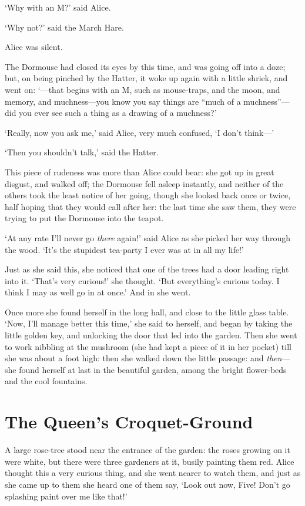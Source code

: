 \documentclass[12pt,openany]{memoir}
\begin{document}
`Why with an M?' said Alice.

`Why not?' said the March Hare.

Alice was silent.

The Dormouse had closed its eyes by this time, and was going off into a doze; but, on being pinched by the Hatter, it woke up again with a little shriek, and went on: `---that begins with an M, such as mouse-traps, and the moon, and memory, and muchness---you know you say things are ``much of a muchness''---did you ever see such a thing as a drawing of a muchness?'

`Really, now you ask me,' said Alice, very much confused, `I don't think---'

`Then you shouldn't talk,' said the Hatter.

This piece of rudeness was more than Alice could bear: she got up in great disgust, and walked off; the Dormouse fell asleep instantly, and neither of the others took the least notice of her going, though she looked back once or twice, half hoping that they would call after her: the last time she saw them, they were trying to put the Dormouse into the teapot.

`At any rate I'll never go \textit{there} again!' said Alice as she picked her way through the wood. `It's the stupidest tea-party I ever was at in all my life!'

Just as she said this, she noticed that one of the trees had a door leading right into it. `That's very curious!' she thought. `But everything's curious today. I think I may as well go in at once.' And in she went.

Once more she found herself in the long hall, and close to the little glass table. `Now, I'll manage better this time,' she said to herself, and began by taking the little golden key, and unlocking the door that led into the garden. Then she went to work nibbling at the mushroom (she had kept a piece of it in her pocket) till she was about a foot high: then she walked down the little passage: and \textit{then}---she found herself at last in the beautiful garden, among the bright flower-beds and the cool fountains.


\chapter{The Queen's Croquet-Ground}

A large rose-tree stood near the entrance of the garden: the roses growing on it were white, but there were three gardeners at it, busily painting them red. Alice thought this a very curious thing, and she went nearer to watch them, and just as she came up to them she heard one of them say, `Look out now, Five! Don't go splashing paint over me like that!'
\end{document}
